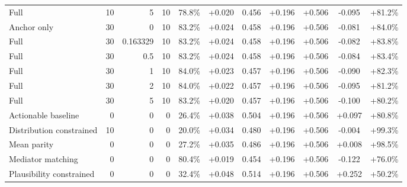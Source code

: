 \begin{table}[htbp]
\begin{tabular}{lrrrccccccc}
Full & 10 & 5 & 10 & 78.8\% & +0.020 & 0.456 & +0.196 & +0.506 & -0.095 & +81.2\% \\
Anchor only & 30 & 0 & 10 & 83.2\% & +0.024 & 0.458 & +0.196 & +0.506 & -0.081 & +84.0\% \\
Full & 30 & 0.163329 & 10 & 83.2\% & +0.024 & 0.458 & +0.196 & +0.506 & -0.082 & +83.8\% \\
Full & 30 & 0.5 & 10 & 83.2\% & +0.024 & 0.458 & +0.196 & +0.506 & -0.084 & +83.4\% \\
Full & 30 & 1 & 10 & 84.0\% & +0.023 & 0.457 & +0.196 & +0.506 & -0.090 & +82.3\% \\
Full & 30 & 2 & 10 & 84.0\% & +0.022 & 0.457 & +0.196 & +0.506 & -0.095 & +81.2\% \\
Full & 30 & 5 & 10 & 83.2\% & +0.020 & 0.457 & +0.196 & +0.506 & -0.100 & +80.2\% \\
Actionable baseline & 0 & 0 & 0 & 26.4\% & +0.038 & 0.504 & +0.196 & +0.506 & +0.097 & +80.8\% \\
Distribution constrained & 10 & 0 & 0 & 20.0\% & +0.034 & 0.480 & +0.196 & +0.506 & -0.004 & +99.3\% \\
Mean parity & 0 & 0 & 0 & 27.2\% & +0.035 & 0.486 & +0.196 & +0.506 & +0.008 & +98.5\% \\
Mediator matching & 0 & 0 & 0 & 80.4\% & +0.019 & 0.454 & +0.196 & +0.506 & -0.122 & +76.0\% \\
Plausibility constrained & 0 & 0 & 0 & 32.4\% & +0.048 & 0.514 & +0.196 & +0.506 & +0.252 & +50.2\% \\
\bottomrule
\end{tabular}
\end{table}